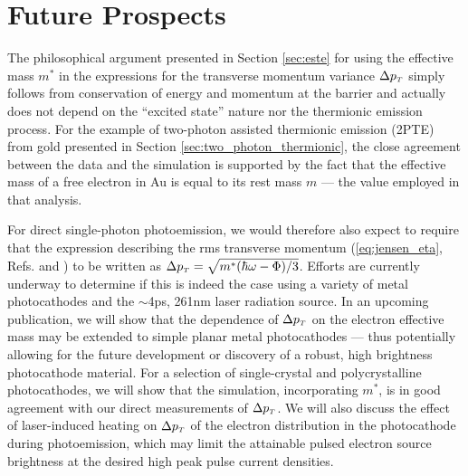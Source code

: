 \section{Future Prospects} \label{sec:photocathode_future}

The philosophical argument presented in Section \ref{sec:este} for using the effective mass $m^*$ in the expressions for the transverse momentum variance $\Delta p_{{\scriptscriptstyle T}}$ simply follows from conservation of energy and momentum at the barrier and actually does not depend on the ``excited state'' nature nor the thermionic emission process.
For the example of two-photon assisted thermionic emission (2PTE) from gold presented in Section \ref{sec:two_photon_thermionic}, the close agreement between the data and the simulation is supported by the fact that the effective mass of a free electron in Au is equal to its rest mass $m$ \cite{johnson_optical_1972} --- the value employed in that analysis.

For direct single-photon photoemission, we would therefore also expect to require that the expression describing the rms transverse momentum (\ref{eq:jensen_eta}, Refs. \cite{dowell_quantum_2009} and \cite{jensen_emittance_2010}) to be written as $\Delta p_{{\scriptscriptstyle T}} = \sqrt{m^* ( \hbar \omega - \Phi ) / 3 }$.
Efforts are currently underway to determine if this is indeed the case using a variety of metal photocathodes and the $\sim$4ps, 261nm laser radiation source.
In an upcoming publication, we will show that the dependence of $\Delta p_{{\scriptscriptstyle T}}$ on the electron effective mass may be extended to simple planar metal photocathodes --- thus potentially allowing for the future development or discovery of a robust, high brightness photocathode material.
For a selection of single-crystal and polycrystalline photocathodes, we will show that the simulation, incorporating $m^*$, is in good agreement with our direct measurements of $\Delta p_{{\scriptscriptstyle T}}$.
We will also discuss the effect of laser-induced heating on $\Delta p_{{\scriptscriptstyle T}}$ of the electron distribution in the photocathode during photoemission, which may limit the attainable pulsed electron source brightness at the desired high peak pulse current densities.
